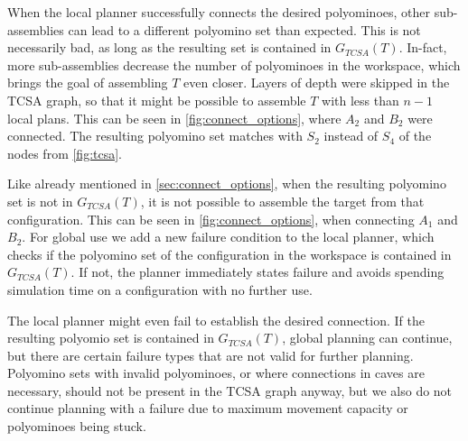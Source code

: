 When the local planner successfully connects the desired polyominoes, other sub-assemblies can lead to a different polyomino set than expected.
This is not necessarily bad, as long as the resulting set is contained in $G_{TCSA}(T)$.
In-fact, more sub-assemblies decrease the number of polyominoes in the workspace, which brings the goal of assembling $T$ even closer.
Layers of depth were skipped in the TCSA graph, so that it might be possible to assemble $T$ with less than $n-1$ local plans.
This can be seen in \autoref{fig:connect_options}, where $A_2$ and $B_2$ were connected. 
The resulting polyomino set matches with $S_2$ instead of $S_4$ of the nodes from \autoref{fig:tcsa}.

Like already mentioned in \autoref{sec:connect_options}, when the resulting polyomino set is not in $G_{TCSA}(T)$, it is not possible to assemble the target from that configuration.
This can be seen in \autoref{fig:connect_options}, when connecting $A_1$ and $B_2$.
For global use we add a new failure condition to the local planner, which checks if the polyomino set of the configuration in the workspace is contained in $G_{TCSA}(T)$.
If not, the planner immediately states failure and avoids spending simulation time on a configuration with no further use.

The local planner might even fail to establish the desired connection.
If the resulting polyomio set is contained in $G_{TCSA}(T)$, global planning can continue, but there are certain failure types that are not valid for further planning.
Polyomino sets with invalid polyominoes, or where connections in caves are necessary, should not be present in the TCSA graph anyway, but we also do not continue planning with a failure due to maximum movement capacity or polyominoes being stuck.

